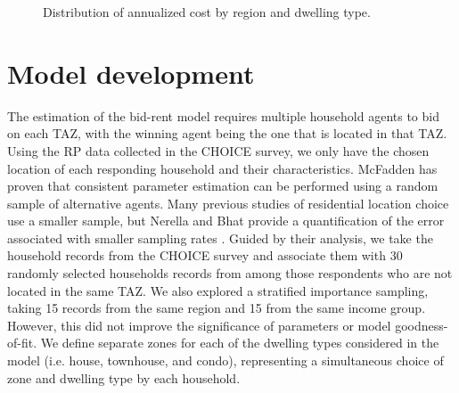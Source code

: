 \begin{figure}[H]
\centering
\caption{\label{fig:real_estate_price}Distribution of annualized cost by region and dwelling type.}
\end{figure}

\section{Model development}
The estimation of the bid-rent model requires multiple household agents to bid on each TAZ, with the winning agent being the one that is located in that TAZ. Using the RP data collected in the CHOICE survey, we only have the chosen location of each responding household and their characteristics. McFadden has proven that consistent parameter estimation can be performed using a random sample of alternative agents. Many previous studies of residential location choice use a smaller sample, but Nerella and Bhat provide a quantification of the error associated with smaller sampling rates \cite{Nerella2004}. Guided by their analysis, we take the household records from the CHOICE survey and associate them with 30 randomly selected households records from among those respondents who are not located in the same TAZ. We also explored a stratified importance sampling, taking 15 records from the same region and 15 from the same income group. However, this did not improve the significance of parameters or model goodness-of-fit. We define separate zones for each of the dwelling types considered in the model (i.e. house, townhouse, and condo), representing a simultaneous choice of zone and dwelling type by each household.

